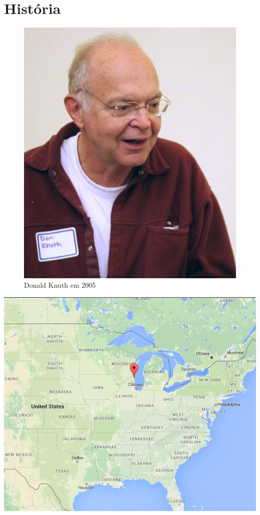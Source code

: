 \section{História}

\begin{frame}[plain]
  \begin{figure}[h]
    \includegraphics[scale=.5]{img/knuth}
    \caption{Donald Knuth em 2005}
  \end{figure}
\end{frame}

\begin{frame}[plain]
  \hspace*{-10.5mm}
  \centering
  \includegraphics[width=\pagewidth]{img/milwaukee}
\end{frame}

